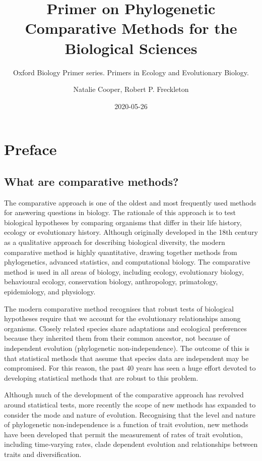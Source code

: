\documentclass[]{book}
\title{Primer on Phylogenetic Comparative Methods for the Biological Sciences}
\subtitle{Oxford Biology Primer series. Primers in Ecology and Evolutionary
Biology.}
\author{Natalie Cooper, Robert P. Freckleton}
\date{2020-05-26}
\begin{document}
\maketitle


\mainmatter

{
\hypersetup{linkcolor=black}
\setcounter{tocdepth}{1}
\tableofcontents
}
\chapter*{Preface}\label{preface}

\section*{What are comparative
methods?}\label{what-are-comparative-methods}

The comparative approach is one of the oldest and most frequently used
methods for answering questions in biology. The rationale of this
approach is to test biological hypotheses by comparing organisms that
differ in their life history, ecology or evolutionary history. Although
originally developed in the 18th century as a qualitative approach for
describing biological diversity, the modern comparative method is highly
quantitative, drawing together methods from phylogenetics, advanced
statistics, and computational biology. The comparative method is used in
all areas of biology, including ecology, evolutionary biology,
behavioural ecology, conservation biology, anthropology, primatology,
epidemiology, and physiology.

The modern comparative method recognises that robust tests of biological
hypotheses require that we account for the evolutionary relationships
among organisms. Closely related species share adaptations and
ecological preferences because they inherited them from their common
ancestor, not because of independent evolution (phylogenetic
non-independence). The outcome of this is that statistical methods that
assume that species data are independent may be compromised. For this
reason, the past 40 years has seen a huge effort devoted to developing
statistical methods that are robust to this problem.

Although much of the development of the comparative approach has
revolved around statistical tests, more recently the scope of new
methods has expanded to consider the mode and nature of evolution.
Recognising that the level and nature of phylogenetic non-independence
is a function of trait evolution, new methods have been developed that
permit the measurement of rates of trait evolution, including
time-varying rates, clade dependent evolution and relationships between
traits and diversification.
\end{document}
